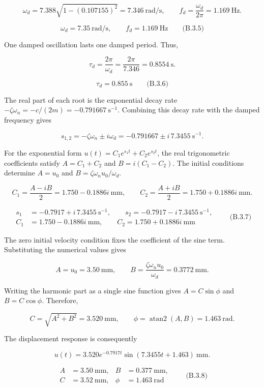 \[
\omega_d=7.388\sqrt{1-(0.107155)^2}=7.346\ \mathrm{rad/s},
\qquad
f_d=\frac{\omega_d}{2\pi}=1.169\ \mathrm{Hz}.
\]

\[
\boxed{\omega_d=7.35\ \mathrm{rad/s},\qquad f_d=1.169\ \mathrm{Hz}}
\qquad\text{(B.3.5)}
\]

One damped oscillation lasts one damped period. Thus,

\[
\tau_d=\frac{2\pi}{\omega_d}=\frac{2\pi}{7.346}=0.8554\ \mathrm{s}.
\]

\[
\boxed{\tau_d=0.855\ \mathrm{s}}
\qquad\text{(B.3.6)}
\]

The real part of each root is the exponential decay rate $-\zeta\omega_n=-c/(2m)=-0.791667\ \mathrm{s^{-1}}$. Combining this decay rate with the damped frequency gives

\[
s_{1,2}=-\zeta\omega_n\pm i\omega_d=-0.791667\pm i\,7.3455\ \mathrm{s^{-1}}.
\]

For the exponential form $u(t)=C_1e^{s_1t}+C_2e^{s_2t}$, the real trigonometric coefficients satisfy $A=C_1+C_2$ and $B=i(C_1-C_2)$. The initial conditions determine $A=u_0$ and $B=\zeta\omega_nu_0/\omega_d$.

\[
C_1=\frac{A-iB}{2}=1.750-0.1886i\ \mathrm{mm},
\qquad
C_2=\frac{A+iB}{2}=1.750+0.1886i\ \mathrm{mm}.
\]

\[
\boxed{
\begin{aligned}
s_1&=-0.7917+i\,7.3455\ \mathrm{s^{-1}},\qquad
s_2=-0.7917-i\,7.3455\ \mathrm{s^{-1}},\\
C_1&=1.750-0.1886i\ \mathrm{mm},\qquad
C_2=1.750+0.1886i\ \mathrm{mm}
\end{aligned}}
\qquad\text{(B.3.7)}
\]

The zero initial velocity condition fixes the coefficient of the sine term. Substituting the numerical values gives

\[
A=u_0=3.50\ \mathrm{mm},
\qquad
B=\frac{\zeta\omega_nu_0}{\omega_d}=0.3772\ \mathrm{mm}.
\]

Writing the harmonic part as a single sine function gives $A=C\sin\phi$ and $B=C\cos\phi$. Therefore,

\[
C=\sqrt{A^2+B^2}=3.520\ \mathrm{mm},
\qquad
\phi=\operatorname{atan2}(A,B)=1.463\ \mathrm{rad}.
\]

The displacement response is consequently

\[
u(t)=3.520e^{-0.7917t}\sin(7.3455t+1.463)\ \mathrm{mm}.
\]

\[
\boxed{
\begin{aligned}
A&=3.50\ \mathrm{mm},& B&=0.377\ \mathrm{mm},\\
C&=3.52\ \mathrm{mm},& \phi&=1.463\ \mathrm{rad}
\end{aligned}}
\qquad\text{(B.3.8)}
\]

